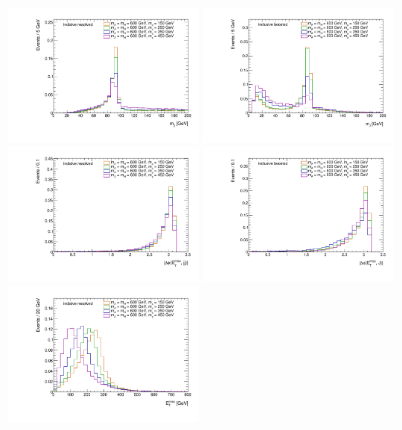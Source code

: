 \begin{figure}
\centering
\includegraphics[width=0.45\textwidth]{texinputs/04_grid/figures/monoz/hadronic/mA600_incl_resl_MJJ_linear.pdf}
\includegraphics[width=0.45\textwidth]{texinputs/04_grid/figures/monoz/hadronic/mA600_incl_merged_MFatJ1_linear.pdf}
\includegraphics[width=0.45\textwidth]{texinputs/04_grid/figures/monoz/hadronic/mA600_incl_resl_dPhiMETJJ_linear.pdf}
\includegraphics[width=0.45\textwidth]{texinputs/04_grid/figures/monoz/hadronic/mA600_incl_merged_dPhiMETJ_linear.pdf}
\includegraphics[width=0.45\textwidth]{texinputs/04_grid/figures/monoz/hadronic/mA600_incl_resl_MET_linear.pdf}

\end{figure}

